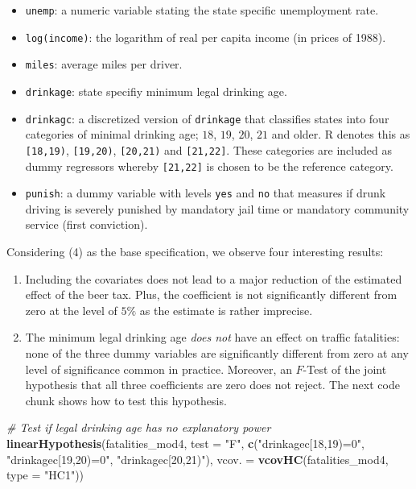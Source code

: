 \documentclass[]{book}
\newenvironment{Shaded}{\begin{snugshade}}{\end{snugshade}}
\newcommand{\KeywordTok}[1]{\textcolor[rgb]{0.13,0.29,0.53}{\textbf{#1}}}
\newcommand{\DataTypeTok}[1]{\textcolor[rgb]{0.13,0.29,0.53}{#1}}
\newcommand{\StringTok}[1]{\textcolor[rgb]{0.31,0.60,0.02}{#1}}
\newcommand{\CommentTok}[1]{\textcolor[rgb]{0.56,0.35,0.01}{\textit{#1}}}
\newcommand{\NormalTok}[1]{#1}
\providecommand{\tightlist}{%
  \setlength{\itemsep}{0pt}\setlength{\parskip}{0pt}}
\theoremstyle{definition}
\theoremstyle{definition}
\theoremstyle{definition}
\theoremstyle{remark}
\begin{document}
\begin{itemize}
\tightlist
\item
  \texttt{unemp}: a numeric variable stating the state specific
  unemployment rate.
\item
  \texttt{log(income)}: the logarithm of real per capita income (in
  prices of 1988).
\item
  \texttt{miles}: average miles per driver.
\item
  \texttt{drinkage}: state specifiy minimum legal drinking age.
\item
  \texttt{drinkagc}: a discretized version of \texttt{drinkage} that
  classifies states into four categories of minimal drinking age;
  \(18\), \(19\), \(20\), \(21\) and older. R denotes this as
  \texttt{{[}18,19)}, \texttt{{[}19,20)}, \texttt{{[}20,21)} and
  \texttt{{[}21,22{]}}. These categories are included as dummy
  regressors whereby \texttt{{[}21,22{]}} is chosen to be the reference
  category.
\item
  \texttt{punish}: a dummy variable with levels \texttt{yes} and
  \texttt{no} that measures if drunk driving is severely punished by
  mandatory jail time or mandatory community service (first conviction).
\end{itemize}

Considering (4) as the base specification, we observe four interesting
results:

\begin{enumerate}
\def\labelenumi{\arabic{enumi}.}
\item
  Including the covariates does not lead to a major reduction of the
  estimated effect of the beer tax. Plus, the coefficient is not
  significantly different from zero at the level of \(5\%\) as the
  estimate is rather imprecise.
\item
  The minimum legal drinking age \emph{does not} have an effect on
  traffic fatalities: none of the three dummy variables are
  significantly different from zero at any level of significance common
  in practice. Moreover, an \(F\)-Test of the joint hypothesis that all
  three coefficients are zero does not reject. The next code chunk shows
  how to test this hypothesis.
\end{enumerate}

\begin{Shaded}
\begin{Highlighting}[]
\CommentTok{# Test if legal drinking age has no explanatory power}
\KeywordTok{linearHypothesis}\NormalTok{(fatalities_mod4,}
                 \DataTypeTok{test =} \StringTok{"F"}\NormalTok{,}
                 \KeywordTok{c}\NormalTok{(}\StringTok{"drinkagec[18,19)=0"}\NormalTok{, }\StringTok{"drinkagec[19,20)=0"}\NormalTok{, }\StringTok{"drinkagec[20,21)"}\NormalTok{), }
                 \DataTypeTok{vcov. =} \KeywordTok{vcovHC}\NormalTok{(fatalities_mod4, }\DataTypeTok{type =} \StringTok{"HC1"}\NormalTok{))}
\end{Highlighting}
\end{Shaded}
\end{document}

